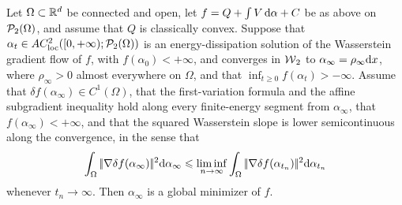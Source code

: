 \begin{prop}\label{prop-classical-convex-stationary}
		Let $\Omega\subset\mathbb{R}^d$ be connected and open, let $f=Q+\int V\,\mathrm{d}\alpha+C$ be as above on $\mathcal{P}_2(\Omega)$, and assume that $Q$ is classically convex. Suppose that $\alpha_t\in AC^2_{\mathrm{loc}}([0,+\infty);\mathcal{P}_2(\Omega))$ is an energy-dissipation solution of the Wasserstein gradient flow of $f$, with $f(\alpha_0)<+\infty$, and converges in $\operatorname{\mathcal{W}}_2$ to $\alpha_\infty=\rho_\infty\mathrm{d} x$, where $\rho_\infty>0$ almost everywhere on $\Omega$, and that $\inf_{t\geq0}f(\alpha_t)>-\infty$. Assume that $\delta f(\alpha_\infty)\in C^1(\Omega)$, that the first-variation formula and the affine subgradient inequality hold along every finite-energy segment from $\alpha_\infty$, that $f(\alpha_\infty)<+\infty$, and that the squared Wasserstein slope is lower semicontinuous along the convergence, in the sense that
	\[
		\int_\Omega|\!| \nabla\delta f(\alpha_\infty) |\!|^2\mathrm{d}\alpha_\infty
		\leqslant
		\liminf_{n\to\infty}
		\int_\Omega|\!| \nabla\delta f(\alpha_{t_n}) |\!|^2\mathrm{d}\alpha_{t_n}
	\]
	whenever $t_n\to\infty$. Then $\alpha_\infty$ is a global minimizer of $f$.
\end{prop}
